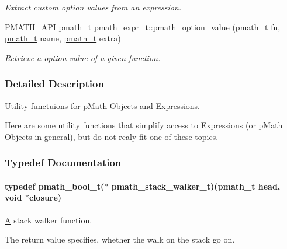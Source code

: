 \begin{CompactItemize}
\begin{CompactList}\small\item\em Extract custom option values from an expression. \item\end{CompactList}\item 
PMATH\_\-API \hyperlink{classpmath__t}{pmath\_\-t} \hyperlink{group__helpers_gc244ab0720278b396976728a39f8bde6}{pmath\_\-expr\_\-t::pmath\_\-option\_\-value} (\hyperlink{classpmath__t}{pmath\_\-t} fn, \hyperlink{classpmath__t}{pmath\_\-t} name, \hyperlink{classpmath__t}{pmath\_\-t} extra)
\begin{CompactList}\small\item\em Retrieve a option value of a given function. \item\end{CompactList}\end{CompactItemize}


\subsubsection{Detailed Description}
Utility functuions for pMath Objects and Expressions. 

Here are some utility functions that simplify access to Expressions (or pMath Objects in general), but do not realy fit one of these topics. 

\subsubsection{Typedef Documentation}
\hypertarget{group__helpers_g11afc6451921f3169224096723483c64}{
\paragraph[{pmath\_\-stack\_\-walker\_\-t}]{\setlength{\rightskip}{0pt plus 5cm}typedef {\bf pmath\_\-bool\_\-t}($\ast$ {\bf pmath\_\-stack\_\-walker\_\-t})({\bf pmath\_\-t} head, void $\ast$closure)}\hfill}
\label{group__helpers_g11afc6451921f3169224096723483c64}


\hyperlink{class_a}{A} stack walker function. 

The return value specifies, whether the walk on the stack go on. 

